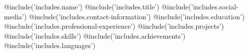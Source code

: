 \documentclass[a4paper,10pt]{article}
\begin{document}
@include('includes.name')
@include('includes.title')
@include('includes.social-media')
@include('includes.contact-information') 
@include('includes.education') 
@include('includes.professional-experience')
@include('includes.projects')
@include('includes.skills')
@include('includes.achievements')
@include('includes.languages')

\end{document}
